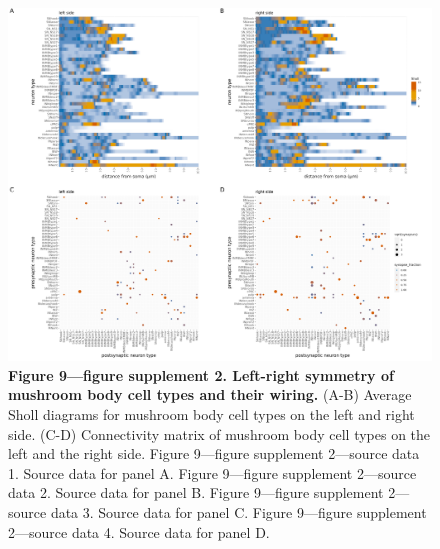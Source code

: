 \documentclass[
  11pt,
]{article}
\begin{document}
\begin{figure}[H]

{\centering \includegraphics[width=1\textwidth,height=\textheight]{Figures/Figure9_fig_Suppl2.png}

}

\caption{\textbf{Figure 9---figure supplement 2. Left-right symmetry of
mushroom body cell types and their wiring.} (A-B) Average Sholl diagrams
for mushroom body cell types on the left and right side. (C-D)
Connectivity matrix of mushroom body cell types on the left and the
right side. Figure 9---figure supplement 2---source data 1. Source data
for panel A. Figure 9---figure supplement 2---source data 2. Source data
for panel B. Figure 9---figure supplement 2---source data 3. Source data
for panel C. Figure 9---figure supplement 2---source data 4. Source data
for panel D.}

\end{figure}%
\end{document}
